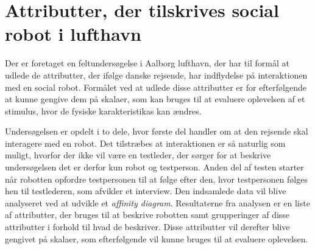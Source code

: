 \chapter*{Attributter, der tilskrives social robot i lufthavn}
%
Der er foretaget en feltundersøgelse i Aalborg lufthavn, der har til formål at udlede de attributter, der ifølge danske rejsende, har indflydelse på interaktionen med en social robot. Formålet ved at udlede disse attributter er for efterfølgende at kunne gengive dem på skalaer, som kan bruges til at evaluere oplevelsen af et stimulus, hvor de fysiske karakteristikas kan ændres. 

Undersøgelsen er opdelt i to dele, hvor første del handler om at den rejsende skal interagere med en robot. Det tilstræbes at interaktionen er så naturlig som muligt, hvorfor der ikke vil være en testleder, der sørger for at beskrive undersøgelsen det er derfor kun robot og testperson. Anden del af testen starter når robotten opfordre testpersonen til at følge efter den, hvor testpersonen følges hen til testlederen, som afvikler et interview. Den indsamlede data vil blive analyseret ved at udvikle et \textit{affinity diagram}. Resultaterne fra analysen er en liste af attributter, der bruges til at beskrive robotten samt grupperinger af disse attributter i forhold til hvad de beskriver. Disse attributter vil derefter blive gengivet på skalaer, som efterfølgende vil kunne bruges til at evaluere oplevelsen.  